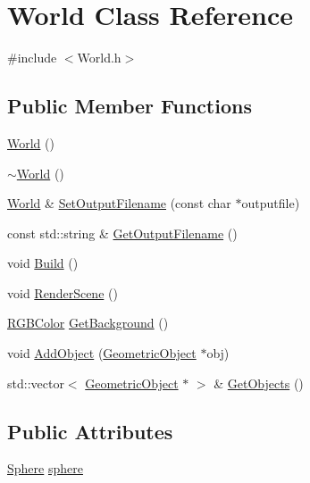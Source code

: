 \hypertarget{class_world}{\section{World Class Reference}
\label{class_world}
}


{\ttfamily \#include $<$World.\-h$>$}

\subsection*{Public Member Functions}
\begin{DoxyCompactItemize}
\item 
\hyperlink{class_world_afa39d4e6f714a7a3691ac0c656f5e8a8}{World} ()
\item 
\hyperlink{class_world_a8c73fba541a5817fff65147ba47cd827}{$\sim$\-World} ()
\item 
\hyperlink{class_world}{World} \& \hyperlink{class_world_ab8c2c9c9724071fecb12e07da23ed3a0}{Set\-Output\-Filename} (const char $\ast$outputfile)
\item 
const std\-::string \& \hyperlink{class_world_a83d567953db755169f120b225b86d817}{Get\-Output\-Filename} ()
\item 
void \hyperlink{class_world_a28703ba1eea1c4bb6b796e551b281926}{Build} ()
\item 
void \hyperlink{class_world_af061ea3ec08fd1657945d32eb3e8f6de}{Render\-Scene} ()
\item 
\hyperlink{class_r_g_b_color}{R\-G\-B\-Color} \hyperlink{class_world_a03b7b9c97f4489692dd4bb64deab44ba}{Get\-Background} ()
\item 
void \hyperlink{class_world_a6f05fe0ba61c2757837910243956636e}{Add\-Object} (\hyperlink{class_geometric_object}{Geometric\-Object} $\ast$obj)
\item 
std\-::vector$<$ \hyperlink{class_geometric_object}{Geometric\-Object} $\ast$ $>$ \& \hyperlink{class_world_a9a33c73e51801825b274e217813c5c90}{Get\-Objects} ()
\end{DoxyCompactItemize}
\subsection*{Public Attributes}
\begin{DoxyCompactItemize}
\item 
\hyperlink{class_sphere}{Sphere} \hyperlink{class_world_a9d34d8c2827f2f93f00ea861bdda1c02}{sphere}
\end{DoxyCompactItemize}


